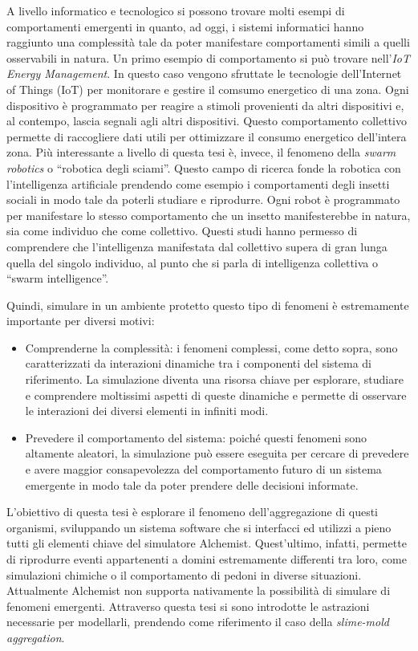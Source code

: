 A livello informatico e tecnologico si possono trovare molti esempi di comportamenti emergenti in quanto, ad oggi, i sistemi informatici hanno 
raggiunto una complessità tale da poter manifestare comportamenti simili a quelli osservabili in natura.
Un primo esempio di comportamento si può trovare nell'\textit{IoT Energy Management}. In questo caso vengono sfruttate le tecnologie dell'Internet of Things (IoT)
per monitorare e gestire il comsumo energetico di una zona. Ogni dispositivo è programmato per reagire a stimoli provenienti da altri dispositivi e, al contempo,
lascia segnali agli altri dispositivi. Questo comportamento collettivo permette di raccogliere dati utili per ottimizzare il consumo energetico dell'intera zona.
Più interessante a livello di questa tesi è, invece, il fenomeno della \textit{swarm robotics} o ``robotica degli sciami''. Questo campo di ricerca fonde la robotica con l'intelligenza artificiale 
prendendo come esempio i comportamenti degli insetti sociali in modo tale da poterli studiare e riprodurre. Ogni robot è programmato per manifestare lo stesso comportamento 
che un insetto manifesterebbe in natura, sia come individuo che come collettivo. Questi studi hanno permesso di comprendere che
l'intelligenza manifestata dal collettivo supera di gran lunga quella del singolo individuo, al punto che si parla di intelligenza collettiva o ``swarm intelligence''.

Quindi, simulare in un ambiente protetto questo tipo di fenomeni è estremamente importante per diversi motivi:
\begin{itemize}
    \item Comprenderne la complessità: i fenomeni complessi, come detto sopra, sono caratterizzati da interazioni dinamiche tra
    i componenti del sistema di riferimento. La simulazione diventa una risorsa chiave per esplorare, studiare e comprendere 
    moltissimi aspetti di queste dinamiche e permette di osservare le interazioni dei diversi elementi in infiniti modi.
    \item Prevedere il comportamento del sistema: poiché questi fenomeni sono altamente aleatori, la simulazione può essere 
    eseguita per cercare di prevedere e avere maggior consapevolezza del comportamento
    futuro di un sistema emergente in modo tale da poter prendere delle decisioni informate.   
\end{itemize}

L'obiettivo di questa tesi è esplorare il fenomeno dell'aggregazione di questi organismi, sviluppando un sistema software che 
si interfacci ed utilizzi a pieno tutti gli elementi chiave del simulatore Alchemist. Quest'ultimo, infatti, permette di riprodurre eventi appartenenti 
a domini estremamente differenti tra loro, come simulazioni chimiche o il comportamento di pedoni in diverse situazioni. Attualmente Alchemist 
non supporta nativamente la possibilità di simulare di fenomeni emergenti. Attraverso questa tesi si sono introdotte
le astrazioni necessarie per modellarli, prendendo come riferimento il caso della \textit{slime-mold aggregation}.
\clearpage

